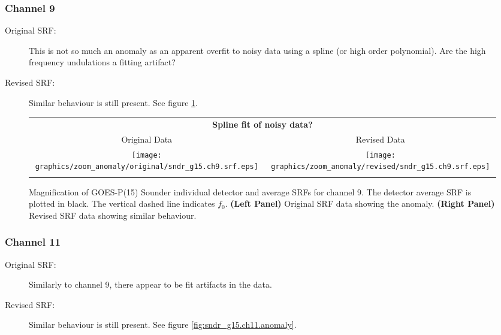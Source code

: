 \subsubsection{Channel 9}
\begin{description}
  \item[Original SRF:] This is not so much an anomaly as an apparent overfit to noisy data using a spline (or high order polynomial). Are the high frequency undulations a fitting artifact?
  \item[Revised SRF:]  Similar behaviour is still present. See figure \ref{fig:sndr_g15.ch9.anomaly}.
\end{description}

\begin{figure}[htp]
  \centering
  \begin{tabular}{c c}
    \multicolumn{2}{c}{\textsf{\bfseries Spline fit of noisy data?}} \\
    \hspace{1.5em}\textsf{Original Data} &
    \hspace{1.5em}\textsf{Revised Data} \\
    \texttt{[image: graphics/zoom\_anomaly/original/sndr\_g15.ch9.srf.eps]} &
    \texttt{[image: graphics/zoom\_anomaly/revised/sndr\_g15.ch9.srf.eps]} \\\\
  \end{tabular}
  \caption{Magnification of GOES-P(15) Sounder individual detector and average SRFs for channel 9. The detector average SRF is plotted in black. The vertical dashed line indicates $f_0$. \textbf{(Left Panel)} Original SRF data showing the anomaly. \textbf{(Right Panel)} Revised SRF data showing similar behaviour.}
  \label{fig:sndr_g15.ch9.anomaly}
\end{figure}

\subsubsection{Channel 11}
\begin{description}
  \item[Original SRF:] Similarly to channel 9, there appear to be fit artifacts in the data.
  \item[Revised SRF:]  Similar behaviour is still present. See figure \ref{fig:sndr_g15.ch11.anomaly}.
\end{description}

